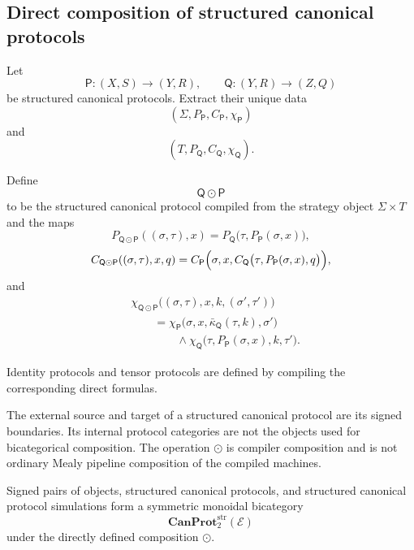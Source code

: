 \subsection{Direct composition of structured canonical protocols}

Let
\[
  \mathsf P:
  (X,S)\to(Y,R),
  \qquad
  \mathsf Q:
  (Y,R)\to(Z,Q)
\]
be structured canonical protocols. Extract their unique data
\[
  (\Sigma,P_{\mathsf P},C_{\mathsf P},\chi_{\mathsf P})
\]
and
\[
  (T,P_{\mathsf Q},C_{\mathsf Q},\chi_{\mathsf Q}).
\]

Define
\[
  \mathsf Q\odot\mathsf P
\]
to be the structured canonical protocol compiled from the strategy object \(\Sigma\times T\) and
the maps
\[
  P_{\mathsf Q\odot\mathsf P}
  ((\sigma,\tau),x)
  =
  P_{\mathsf Q}
  \bigl(
    \tau,
    P_{\mathsf P}(\sigma,x)
  \bigr),
\]
\[
\begin{aligned}
  C_{\mathsf Q\odot\mathsf P}
  ((\sigma,\tau),x,q)
  =
  C_{\mathsf P}
  \Bigl(
    \sigma,
    x,
    C_{\mathsf Q}
    \bigl(
      \tau,
      P_{\mathsf P}(\sigma,x),
      q
    \bigr)
  \Bigr),
\end{aligned}
\]
and
\[
\begin{aligned}
&\chi_{\mathsf Q\odot\mathsf P}
\bigl(
  (\sigma,\tau),
  x,
  k,
  (\sigma',\tau')
\bigr)
\\
&\qquad=
\chi_{\mathsf P}
\bigl(
  \sigma,
  x,
  \bar\kappa_{\mathsf Q}(\tau,k),
  \sigma'
\bigr)
\\
&\qquad\qquad\wedge
\chi_{\mathsf Q}
\bigl(
  \tau,
  P_{\mathsf P}(\sigma,x),
  k,
  \tau'
\bigr).
\end{aligned}
\]

Identity protocols and tensor protocols are defined by compiling the corresponding direct formulas.

The external source and target of a structured canonical protocol are its signed boundaries. Its
internal protocol categories are not the objects used for bicategorical composition. The operation
\(\odot\) is compiler composition and is not ordinary Mealy pipeline composition of the compiled
machines.

\begin{theorem}
\label{thm:canonical-protocol-bicategory}
Signed pairs of objects, structured canonical protocols, and structured canonical protocol
simulations form a symmetric monoidal bicategory
\[
  \mathbf{CanProt}^{\mathrm{str}}_2(\mathcal E)
\]
under the directly defined composition \(\odot\).
\end{theorem}

